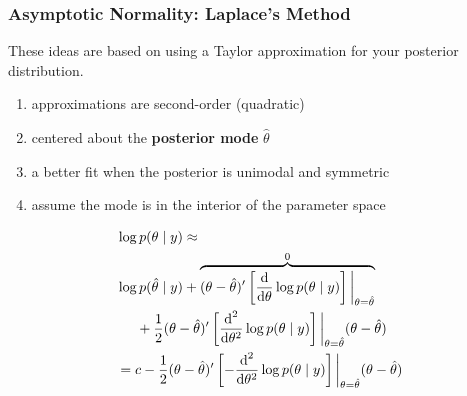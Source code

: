 \documentclass{beamer}
\begin{document}
\begin{frame}
\frametitle{Asymptotic Normality: Laplace's Method}

These ideas are based on using a Taylor approximation for your posterior distribution. 
\begin{enumerate}
\item approximations are second-order (quadratic)
\item centered about the {\bf posterior mode} $\hat{\theta}$
\item a better fit when the posterior is unimodal and symmetric
\item assume the mode is in the interior of the parameter space
\end{enumerate}
\pause

\begin{align*}
&\log p(\theta \mid y ) \approx \\
&\log p(\hat{\theta} \mid y) + \overbrace{(\theta - \hat{\theta})'\left[ \frac{\text{d}}{\text{d}\theta} \log p(\theta \mid y) \right] \bigg|_{\theta = \hat{\theta}}}^{0}  \\
&\hspace{5mm}  + \frac{1}{2}(\theta - \hat{\theta})'\left[\frac{\text{d}^2}{\text{d}\theta^2} \log p(\theta \mid y)\right] \bigg|_{\theta = \hat{\theta}}(\theta - \hat{\theta}) \\
&= c  - \frac{1}{2}(\theta - \hat{\theta})'\left[-\frac{\text{d}^2}{\text{d}\theta^2} \log p(\theta \mid y)\right] \bigg|_{\theta = \hat{\theta}}(\theta - \hat{\theta})
\end{align*}

\end{frame}
\end{document}
